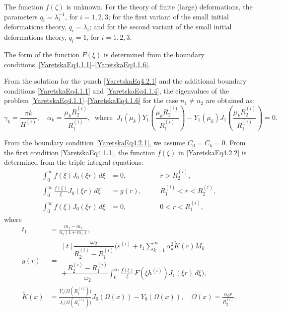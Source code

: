 The function \( f(\zeta) \) is unknown. For the theory of finite (large) deformations, the parameters \( q_i = \lambda_i^{-1} \), for \( i = 1,2,3 \); for the first variant of the small initial deformations theory, \( q_i = \lambda_i \); and for the second variant of the small initial deformations theory, \( q_i = 1 \), for \( i = 1,2,3 \).

The form of the function \( F(\xi) \) is determined from the boundary conditions~\eqref{YaretskaEq4.1.1}–\eqref{YaretskaEq4.1.6}.

From the solution for the punch \eqref{YaretskaEq4.2.1} and the additional boundary conditions \eqref{YaretskaEq4.1.1} and \eqref{YaretskaEq4.1.4}, the eigenvalues of the problem \eqref{YaretskaEq4.1.1}–\eqref{YaretskaEq4.1.6} for the case \( n_1 \ne n_2 \) are obtained as:
\[
\gamma_k = \frac{\pi k}{H^{(i)}}, \quad \alpha_k = \frac{\mu_k R_2^{(i)}}{R_1^{(i)}}, \;\; \text{where} \;\; J_1(\mu_k) Y_1\left(\frac{\mu_k R_2^{(i)}}{R_1^{(i)}}\right) - Y_1(\mu_k) J_1\left(\frac{\mu_k R_2^{(i)}}{R_1^{(i)}}\right) = 0.
\]

From the boundary condition \eqref{YaretskaEq4.2.1}, we assume \( C_0 = C_k = 0 \). From the first condition \eqref{YaretskaEq4.1.1}, the function \( f(\xi) \) in \eqref{YaretskaEq4.2.2} is determined from the triple integral equations:
\begin{equation}
	\begin{aligned}
		\int_0^\infty f(\xi) J_0(\xi r)\, d\xi &= 0, && \quad r > R_2^{(i)}, \\
		\int_0^\infty \frac{f(\xi)}{\xi} J_0(\xi r)\, d\xi &= g(r), && \quad R_1^{(i)} < r < R_2^{(i)}, \\
		\int_0^\infty f(\xi) J_0(\xi r)\, d\xi &= 0, && \quad 0 < r < R_1^{(i)},
	\end{aligned}
	\label{YaretskaEq4.2.3}
\end{equation}
where
\begin{align*}
t_1 &= \frac{m_1 - m_2}{n_2 (1 + m_1)},
\\
g(r) &= 
\begin{multlined}[t]
\dfrac{\omega_2}{R_2^{(i)} - R_1^{(i)}} \bigg( \varepsilon^{(i)} + t_1 \sum_{k=1}^\infty \alpha_k^2 \tilde{K}(r) M_k 
\\
+ \dfrac{R_2^{(i)} - R_1^{(i)}}{\omega_2} \int_0^\infty \frac{f(\xi)}{\xi} F(\xi h^{(i)}) J_1(\xi r)\, d\xi \bigg),
\end{multlined}
\\
\tilde{K}(x) &= \frac{Y_1\big(\Omega(R_1^{(i)})\big)}{J_1\big(\Omega(R_1^{(i)})\big)} J_0(\Omega(x)) - Y_0(\Omega(x)), \quad \Omega(x) = \frac{\alpha_k x}{R_2^{(i)}}.
\end{align*}

